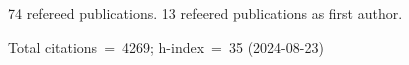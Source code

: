 74 refereed publications. 13 refeered publications as first author.

Total citations~=~4269; h-index~=~35 (2024-08-23)